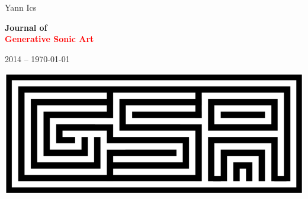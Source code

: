\documentclass{book}
\begin{document}
\pagecolor{aureolin!30}
\begin{titlepage} %

	\raggedleft %
	
	\vspace*{\baselineskip} %
	
	{\huge  \textsf{Yann Ics}} %
	
	\vspace*{0.167\textheight} %
	
	\textbf{\LARGE Journal of}\\[\baselineskip] %
	
	{\textcolor{Red}{\Huge \textbf{Generative Sonic Art}}}\\[\baselineskip] %
	
	\vspace{4mm} 
	
	{\Large \textsf{2014 -- \today}} %
	
	\vfill %
	
	{\includegraphics[scale=0.4]{img/4563}}

	\vspace*{3\baselineskip} %

\end{titlepage}
\pagecolor{white}

\renewcommand{\chaptermark}[1]{ \markboth{#1}{} }
\renewcommand{\sectionmark}[1]{ \markright{Generative Sonic Art} }



\tableofcontents

{\let\clearpage\relax\listofalgorithms}
\thispagestyle{empty}

{\let\cleardoublepage\clearpage \listoffigures}
\end{document}
